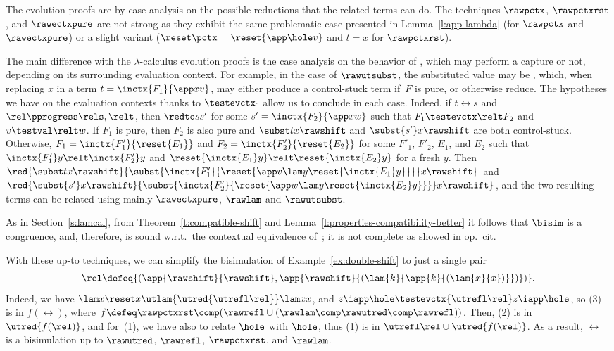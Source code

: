 \documentclass{lmcs}
\theoremstyle{defC}
\begin{document}
\noindent
The evolution proofs are by case analysis on the possible reductions that the
related terms can do. The techniques $\rawpctx$, $\rawpctxrst$, and
$\rawectxpure$ are not strong as they exhibit the same problematic case
presented in Lemma~\ref{l:app-lambda} (for $\rawpctx$ and $\rawectxpure$) or a
slight variant ($\reset \pctx = \reset{\app \hole v}$ and $t =x$ for
$\rawpctxrst$).

The main difference with the $\lambda$-calculus evolution proofs is the case
analysis on the behavior of \textshift, which may perform a capture or not,
depending on its surrounding evaluation context. For example, in the case of
$\rawutsubst$, the substituted value may be \textshift, which, when replacing
$x$ in a term $t = \inctx {F_1}{\app x v}$, may either produce a control-stuck
term if~$F$ is pure, or otherwise reduce. The hypotheses we have on the
evaluation contexts thanks to $\testevctx\cdot$ allow us to conclude in each
case. Indeed, if $t \rel s$ and $\rel \pprogress \rels,\relt$, then
$\redto s {s'}$ for some $s' = \inctx {F_2}{\app x w}$ such that
$F_1 \testevctx\relt F_2$ and $v \testval\relt w$. If $F_1$ is pure, then $F_2$
is also pure and $\subst t x \rawshift$ and $\subst {s'} x \rawshift$ are both
control-stuck. Otherwise, $F_1 = \inctx {F'_1}{\reset {E_1}}$ and
$F_2 = \inctx {F'_2}{\reset {E_2}}$ for some $F'_1$, $F'_2$, $E_1$, and $E_2$
such that $\inctx {F'_1} y \relt \inctx {F'_2} y$ and
$\reset{\inctx {E_1} y} \relt \reset{\inctx {E_2} y}$ for a fresh $y$. Then
$\red {\subst t x \rawshift}{\subst{\inctx {F'_1}{\reset{\app v {\lam y
          {\reset{\inctx {E_1} y}}}}}} x \rawshift}$ and
$\red{\subst {s'} x \rawshift}{\subst{\inctx {F'_2}{\reset{\app w {\lam y
          {\reset{\inctx {E_2} y}}}}}} x \rawshift}$, and the two resulting
terms can be related using mainly $\rawectxpure$, $\rawlam$ and $\rawutsubst$.




As in Section~\ref{s:lamcal}, from
Theorem~\ref{t:compatible-shift} and
Lemma~\ref{l:properties-compatibility-better} it follows that $\bisim$
is a congruence, and, therefore, is sound w.r.t.\ the contextual
equivalence of~\cite{Biernacki-al:HAL15}; it is not complete as showed
in op.\ cit.

\begin{exa}
  With these up-to techniques, we can simplify the bisimulation of
  Example~\ref{ex:double-shift} to just a single pair
  \[\mathord{\rel} \defeq \{ (\app{\rawshift}{\rawshift},
  \app{\rawshift}{(\lam{k}{\app{k}{(\lam{x}{x})}})}) \}.\]
  Indeed, we have $\lam x {\reset x} \utlam{\utred{\utrefl \rel}} \lam x x$, and
  $z \iapp \hole \testevctx{\utrefl \rel} z \iapp \hole$, so (3) is in
  $f(\rel)$, where
  $f \defeq \rawpctxrst \comp (\rawrefl \cup (\rawlam \comp \rawutred \comp
  \rawrefl))$.
  Then, (2) is in $\utred{f(\rel)}$, and for~(1), we have also to relate $\hole$
  with $\hole$, thus (1) is in $\utrefl\rel \cup \utred{f(\rel)}$. As a result,
  $\rel$ is a bisimulation up to $\rawutred$, $\rawrefl$, $\rawpctxrst$, and
  $\rawlam$.
\end{exa}
\end{document}
